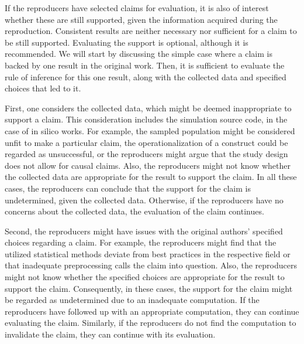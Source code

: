 \documentclass[authordate, meta]{jote-new-article}
\begin{document}
	If the reproducers have selected claims for evaluation, it is also of interest whether these are still supported, given the information acquired during the reproduction. Consistent results are neither necessary nor sufficient for a claim to be still supported. Evaluating the support is optional, although it is recommended. We will start by discussing the simple case where a claim is backed by one result in the original work. Then, it is sufficient to evaluate the rule of inference for this one result, along with the collected data and specified choices that led to it.


	First, one considers the collected data, which might be deemed inappropriate to support a claim. This consideration includes the simulation source code, in the case of in silico works. For example, the sampled population might be considered unfit to make a particular claim, the operationalization of a construct could be regarded as unsuccessful, or the reproducers might argue that the study design does not allow for causal claims. Also, the reproducers might not know whether the collected data are appropriate for the result to support the claim. In all these cases, the reproducers can conclude that the support for the claim is undetermined, given the collected data. Otherwise, if the reproducers have no concerns about the collected data, the evaluation of the claim continues.


	Second, the reproducers might have issues with the original authors' specified choices regarding a claim. For example, the reproducers might find that the utilized statistical methods deviate from best practices in the respective field or that inadequate preprocessing calls the claim into question. Also, the reproducers might not know whether the specified choices are appropriate for the result to support the claim. Consequently, in these cases, the support for the claim might be regarded as undetermined due to an inadequate computation. If the reproducers have followed up with an appropriate computation, they can continue evaluating the claim. Similarly, if the reproducers do not find the computation to invalidate the claim, they can continue with its evaluation.
\end{document}

